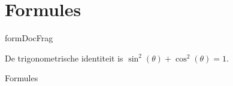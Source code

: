 \documentclass[../presentatie.tex]{subfiles}
\begin{document}
\section{Formules}

\clearrecentlist
    



\begin{saveblock}{formDocFrag}
	\begin{highlightblock}[gobble=8,linewidth=25em,framexleftmargin=0.25em]
		De trigonometrische identiteit
		is $ \sin^2(\theta) + \cos^2(\theta) = 1 $.
	\end{highlightblock}
\end{saveblock}

\begin{frame}{Formules}
	\centering
	
	\vspace{10pt}
	\begin{center}%
	\end{center}
	
\end{frame}

\def\extraslistsep{\hspace{0.5em}\textcolor{red!80!black}{\vrule width 1pt height 0.6\baselineskip\relax}\hspace{0.5em}}
\def\es#1{\adjustbox{scale=0.8}{#1}}
\end{document}
